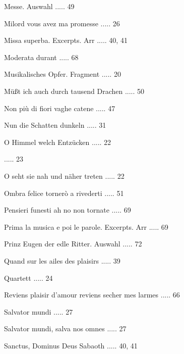 \documentclass[a4paper, twocolumn, 11pt]{book}
\begin{document}
\newline 
Messe. Auswahl ..... 49

\newline 
Milord vous avez ma promesse ..... 26

\newline 
Missa superba. Excerpts. Arr ..... 40, 41

\newline 
Moderata durant ..... 68

\newline 
Musikalisches Opfer. Fragment ..... 20

\newline 
Müßt ich auch durch tausend Drachen ..... 50

\newline 
Non più di fiori vaghe catene ..... 47

\newline 
Nun die Schatten dunkeln ..... 31

\newline 
O Himmel welch Entzücken ..... 22

 ..... 23

\newline 
O seht sie nah und näher treten ..... 22

\newline 
Ombra felice tornerò a rivederti ..... 51

\newline 
Pensieri funesti ah no non tornate ..... 69

\newline 
Prima la musica e poi le parole. Excerpts. Arr ..... 69

\newline 
Prinz Eugen der edle Ritter. Auswahl ..... 72

\newline 
Quand sur les ailes des plaisirs ..... 39

\newline 
Quartett ..... 24

\newline 
Reviens plaisir d'amour reviens secher mes larmes ..... 66

\newline 
Salvator mundi ..... 27

\newline 
Salvator mundi, salva nos omnes ..... 27

\newline 
Sanctus, Dominus Deus Sabaoth ..... 40, 41
\end{document}
